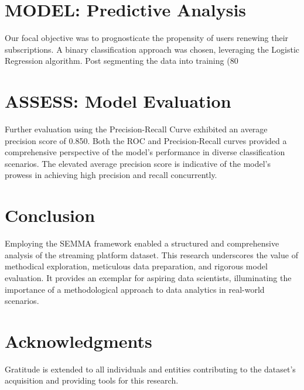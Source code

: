 \documentclass{article}
\begin{document}
\section{MODEL: Predictive Analysis}
Our focal objective was to prognosticate the propensity of users renewing their subscriptions. A binary classification approach was chosen, leveraging the Logistic Regression algorithm. Post segmenting the data into training (80%

\section{ASSESS: Model Evaluation}
Further evaluation using the Precision-Recall Curve exhibited an average precision score of 0.850. Both the ROC and Precision-Recall curves provided a comprehensive perspective of the model's performance in diverse classification scenarios. The elevated average precision score is indicative of the model's prowess in achieving high precision and recall concurrently.

\section{Conclusion}
Employing the SEMMA framework enabled a structured and comprehensive analysis of the streaming platform dataset. This research underscores the value of methodical exploration, meticulous data preparation, and rigorous model evaluation. It provides an exemplar for aspiring data scientists, illuminating the importance of a methodological approach to data analytics in real-world scenarios.

\section{Acknowledgments}
Gratitude is extended to all individuals and entities contributing to the dataset's acquisition and providing tools for this research.
\end{document}
